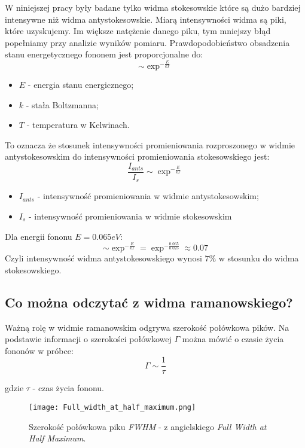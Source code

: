 W niniejszej pracy były badane tylko widma stokesowskie które są dużo bardziej intensywne niż widma antystokesowskie. Miarą intensywności widma są piki, które uzyskujemy. Im większe natężenie danego piku, tym mniejszy błąd popełniamy przy analizie wyników pomiaru.
Prawdopodobieństwo obsadzenia stanu energetycznego fononem jest proporcjonalne do:
\begin{equation}
	\sim \exp^{-\frac{E}{kT}} 
\end{equation}
\begin{itemize}
	\item{$E$ - energia stanu energicznego};
	\item{$k$ - stała Boltzmanna};
	\item{$T$ - temperatura w Kelwinach}.
\end{itemize}
To oznacza że stosunek intensywności promieniowania rozproszonego w widmie antystokesowskim do intensywności promieniowania stokesowskiego jest:
\begin{equation}
	\frac{I_{ants}}{I_s} \sim \exp^{-\frac{E}{kT}}
\end{equation}
\begin{itemize}
	\item{$I_{ants}$ - intensywność promieniowania w widmie antystokesowskim};
	\item{$I_s$ - intensywność promieniowania w widmie stokesowskim}
\end{itemize}
	Dla energii fononu $E = 0.065eV$:
\begin{equation}
	\sim \exp^{-\frac{E}{kT}} = \exp^{-\frac{0.065}{0.025}} \approx 0.07
\end{equation}
Czyli intensywność widma antystokesowskiego wynosi $7\%$ w stosunku do widma stokesowskiego. 
\subsection{Co można odczytać z widma ramanowskiego?}
Ważną rolę w widmie ramanowskim odgrywa szerokość połówkowa pików.
Na podstawie informacji o szerokości połówkowej $\Gamma$ można mówić o czasie życia fononów w próbce:
\begin{equation}
	\Gamma \sim \frac{1}{\tau}
\end{equation}

gdzie $\tau$ - czas życia fononu.

\begin{figure}[H]
	\begin{center}
		\texttt{[image: Full\_width\_at\_half\_maximum.png]}
		\caption{Szerokość połówkowa piku \textit{FWHM} - z angielskiego \textit{Full Width at Half Maximum}.}
	\end{center}
\end{figure}

